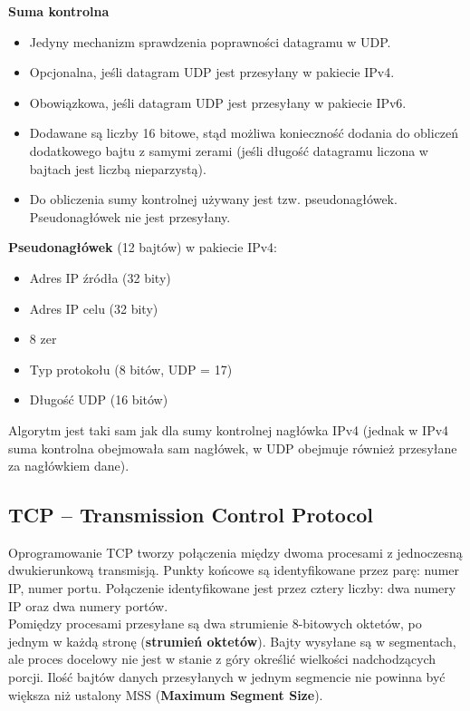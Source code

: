 \documentclass[a4paper]{article}
\begin{document}
\textbf{Suma kontrolna}\\
\begin{itemize}
    \item Jedyny mechanizm sprawdzenia poprawności datagramu w UDP.
    \item Opcjonalna, jeśli datagram UDP jest przesyłany w pakiecie IPv4.
    \item Obowiązkowa, jeśli datagram UDP jest przesyłany w pakiecie IPv6.
    \item Dodawane są liczby 16 bitowe, stąd możliwa konieczność dodania do obliczeń
dodatkowego bajtu z samymi zerami (jeśli długość datagramu liczona w bajtach jest liczbą
nieparzystą).
    \item Do obliczenia sumy kontrolnej używany jest tzw. pseudonagłówek. Pseudonagłówek nie jest przesyłany.
\end{itemize}

\textbf{Pseudonagłówek} (12 bajtów) w pakiecie IPv4:
\begin{itemize}
    \item Adres IP źródła (32 bity)
    \item Adres IP celu (32 bity)
    \item 8 zer
    \item Typ protokołu (8 bitów, UDP = 17)
    \item Długość UDP (16 bitów)
\end{itemize}
Algorytm jest taki sam jak dla sumy kontrolnej nagłówka IPv4 (jednak w IPv4 suma kontrolna
obejmowała sam nagłówek, w UDP obejmuje również przesyłane za nagłówkiem dane).

\subsection{TCP – Transmission Control Protocol}
Oprogramowanie TCP tworzy połączenia między dwoma procesami z
jednoczesną dwukierunkową transmisją. Punkty końcowe są identyfikowane przez parę: numer IP, numer
portu. Połączenie identyfikowane jest przez cztery liczby: dwa numery IP oraz dwa
numery portów.\\
Pomiędzy procesami przesyłane są dwa strumienie 8-bitowych oktetów, po jednym
w każdą stronę (\textbf{strumień oktetów}). Bajty wysyłane są w
segmentach, ale proces docelowy nie jest w stanie z góry określić
wielkości nadchodzących porcji. Ilość bajtów danych przesyłanych w jednym segmencie nie powinna być większa niż ustalony MSS (\textbf{Maximum Segment Size}).\\
\end{document}
